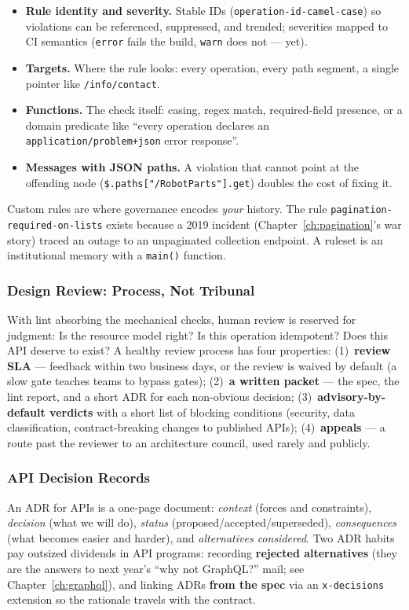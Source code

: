 \begin{itemize}
  \item \textbf{Rule identity and severity.} Stable IDs
        (\texttt{operation-id-camel-case}) so violations can be
        referenced, suppressed, and trended; severities mapped to CI
        semantics (\texttt{error} fails the build, \texttt{warn} does
        not --- yet).
  \item \textbf{Targets.} Where the rule looks: every operation, every
        path segment, a single pointer like \texttt{/info/contact}.
  \item \textbf{Functions.} The check itself: casing, regex match,
        required-field presence, or a domain predicate like ``every
        operation declares an \texttt{application/problem+json} error
        response''.
  \item \textbf{Messages with JSON paths.} A violation that cannot point
        at the offending node (\texttt{\$.paths["/RobotParts"].get})
        doubles the cost of fixing it.
\end{itemize}

Custom rules are where governance encodes \emph{your} history. The rule
\texttt{pagination-required-on-lists} exists because a 2019 incident
(Chapter~\ref{ch:pagination}'s war story) traced an outage to an
unpaginated collection endpoint. A ruleset is an institutional memory with
a \texttt{main()} function.

\subsubsection{Design Review: Process, Not Tribunal}
With lint absorbing the mechanical checks, human review is reserved for
judgment: Is the resource model right? Is this operation idempotent? Does
this API deserve to exist? A healthy review process has four properties:
(1)~\textbf{review SLA} --- feedback within two business days, or the
review is waived by default (a slow gate teaches teams to bypass gates);
(2)~\textbf{a written packet} --- the spec, the lint report, and a short
ADR for each non-obvious decision; (3)~\textbf{advisory-by-default
verdicts} with a short list of blocking conditions (security, data
classification, contract-breaking changes to published APIs);
(4)~\textbf{appeals} --- a route past the reviewer to an architecture
council, used rarely and publicly.

\subsubsection{API Decision Records}
An ADR for APIs is a one-page document: \emph{context} (forces and
constraints), \emph{decision} (what we will do), \emph{status}
(proposed/accepted/superseded), \emph{consequences} (what becomes easier
and harder), and \emph{alternatives considered}. Two ADR habits pay
outsized dividends in API programs: recording \textbf{rejected
alternatives} (they are the answers to next year's ``why not GraphQL?''
mail; see Chapter~\ref{ch:graphql}), and linking ADRs \textbf{from the
spec} via an \texttt{x-decisions} extension so the rationale travels with
the contract.

